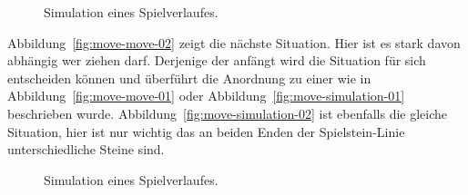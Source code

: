 \vspace{1em}
\begin{figure}
    \centering
    \qquad
    \caption{Simulation eines Spielverlaufes.}
\end{figure}

Abbildung~\ref{fig:move-move-02} zeigt die n\"achste Situation.
Hier ist es stark davon abh\"angig wer ziehen darf.
Derjenige der anf\"angt wird die Situation f\"ur sich entscheiden k\"onnen und \"uberf\"uhrt die Anordnung zu einer wie in Abbildung~\ref{fig:move-move-01} oder Abbildung~\ref{fig:move-simulation-01} beschrieben wurde.
Abbildung~\ref{fig:move-simulation-02} ist ebenfalls die gleiche Situation, hier ist nur wichtig das an beiden Enden der Spielstein-Linie unterschiedliche Steine sind.

\vspace{1em}
\begin{figure}
    \centering
    \qquad
    \caption{Simulation eines Spielverlaufes.}
\end{figure}

